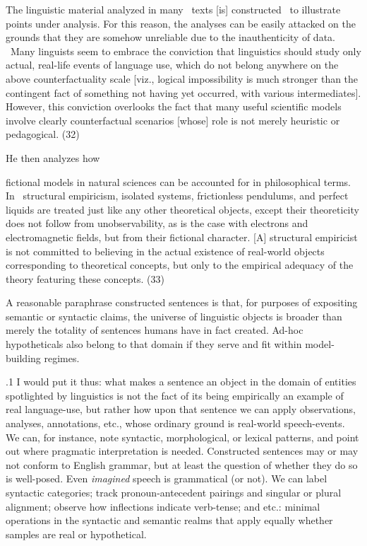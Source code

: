 \documentclass[11pt, twocolumn]{article}
\begin{document}
{{{\begin{blockQuote}
The linguistic material analyzed in many \ellThree{2pt}{2pt}\ texts [is] constructed
\ellThree{2pt}{2pt}\ to illustrate points under analysis.
For this reason, the analyses can be easily attacked on the grounds that
they are somehow unreliable due to the inauthenticity of data. \ellThree{2pt}{2pt}\
Many linguists seem to embrace the conviction that linguistics should
study only actual, real-life events of language use, which do not belong anywhere on the above
counterfactuality scale [viz., logical impossibility is much stronger
than the contingent fact of something not having yet occurred, with
various intermediates]. However, this conviction overlooks the fact
that many useful scientific models involve clearly counterfactual scenarios
[whose] role is not merely heuristic or pedagogical. \citePage{kow}(32)
\end{blockQuote}

\nip{}%
He then analyzes how \upAdj{9pt}

\begin{blockQuote}
fictional models in natural sciences can be accounted for in
philosophical terms. In \hspace{-1pt} \ellThree{2pt}{2pt}\ structural empiricism, isolated
systems, frictionless pendulums, and perfect liquids are treated just like
any other theoretical objects, except their theoreticity does not follow from
unobservability, as is the case with electrons and electromagnetic fields, but
from their fictional character. [A] structural empiricist is not
committed to believing in the actual existence of real-world objects corresponding
to theoretical concepts, but only to the empirical adequacy of the theory
featuring these concepts. \citePage{kow}(33)
\end{blockQuote}

\nip{}%
A reasonable paraphrase \visavis{} constructed sentences is that, for purposes
of expositing semantic or syntactic claims, the universe of linguistic
objects is broader than merely the totality of sentences humans have in
fact created. Ad-hoc hypotheticals also belong to that
domain if they serve and fit within model-building regimes.
}%

\p.1{%
I would put it thus: what makes a sentence an object in the
domain of entities spotlighted by linguistics is not the
fact of its being empirically an example of real language-use, but
rather how upon that sentence we can apply observations, analyses,
annotations, etc., whose ordinary ground is real-world
speech-events. We can, for instance, note syntactic, morphological, or lexical patterns,
and point out where pragmatic interpretation is needed. Constructed
sentences may or may not conform to English grammar,
but at least the question of whether they do so is
well-posed. Even \textit{imagined} speech
\pgl{}is grammatical (or not).
We can label syntactic categories; track
pronoun-antecedent pairings and singular or plural alignment; observe
how inflections indicate verb-tense; and etc.: minimal operations in the
syntactic and semantic realms that apply equally
whether samples are real or hypothetical.
}%

}}
\end{document}

